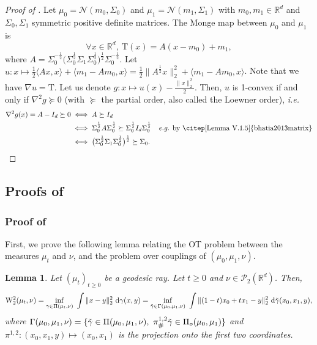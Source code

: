 \documentclass[twoside]{article}
\newtheorem{lemma}{Lemma}
\newcommand{\W}{\mathrm{W}}
\newcommand{\T}{\mathrm{T}}
\begin{document}
\begin{proof}[Proof of ]
    Let $\mu_0=\mathcal{N}(m_0,\Sigma_0)$ and $\mu_1=\mathcal{N}(m_1,\Sigma_1)$ with $m_0,m_1\in\mathbb{R}^d$ and $\Sigma_0,\Sigma_1$ symmetric positive definite matrices. The Monge map between $\mu_0$ and $\mu_1$ is \citep[Remark 2.31]{peyre2019computational} 
    \begin{equation}
        \forall x\in \mathbb{R}^d,\ \T(x) = A(x-m_0) + m_1,
    \end{equation}
    where $A=\Sigma_0^{-\frac12}\big(\Sigma_0^{\frac12}\Sigma_1\Sigma_0^{\frac12}\big)^\frac12 \Sigma_0^{-\frac12}$. Let $u:x\mapsto \frac12 \langle Ax,x\rangle + \langle m_1-Am_0,x\rangle = \frac12 \|A^{\frac12}x\|_2^2 + \langle m_1-Am_0,x\rangle$. Note that we have $\nabla u = \T$. Let us denote $g:x\mapsto u(x) - \frac{\|x\|_2^2}{2}$. Then, $u$ is 1-convex if and only if $\nabla^2 g \succeq 0$ (with $\succeq$ the partial order, also called the Loewner order), \emph{i.e.}
    \begin{equation} \label{eq:geodesic_rays_gaussians}
        \begin{aligned}
            \nabla^2 g(x) = A-I_d \succeq 0 &\iff A \succeq I_d \\
            &\iff \Sigma_0^{\frac12} A \Sigma_0^{\frac12} \succeq \Sigma_0^{\frac12} I_d \Sigma_0^{\frac12} \quad \text{\emph{e.g.} by \citep[Lemma V.1.5]{bhatia2013matrix}} \\
            &\iff \big(\Sigma_0^{\frac12}\Sigma_1\Sigma_0^{\frac12}\big)^{\frac12} \succeq \Sigma_0.
        \end{aligned}
    \end{equation}
\end{proof}


\subsection{Proofs of } \label{proofs:busemann}

\subsubsection{Proof of } \label{proof:prop_busemann_general}

First, we prove the following lemma relating the OT problem between the measures $\mu_t$ and $\nu$, and the problem over couplings of $(\mu_0,\mu_1,\nu)$.
\begin{lemma} \label{lemma:ot_geod}
    Let $(\mu_t)_{t\ge 0}$ be a geodesic ray. Let $t\ge 0$ and $\nu\in\mathcal{P}_2(\mathbb{R}^d)$. Then, 
    \begin{equation}
        \W_2^2(\mu_t,\nu) = \inf_{\gamma\in\Pi(\mu_t,\nu)}\ \int \|x-y\|_2^2\ \mathrm{d}\gamma(x,y) = \inf_{\Tilde{\gamma}\in \Gamma(\mu_0,\mu_1,\nu)}\ \int \|(1-t)x_0+tx_1 -y\|_2^2\ \mathrm{d}\Tilde{\gamma}(x_0,x_1,y),
    \end{equation}
    where $\Gamma(\mu_0,\mu_1,\nu) = \{\Tilde{\gamma}\in\Pi(\mu_0,\mu_1,\nu),\ \pi^{1,2}_\#\Tilde{\gamma}\in\Pi_o(\mu_0,\mu_1)\}$ and $\pi^{1,2}:(x_0,x_1,y)\mapsto (x_0,x_1)$ is the projection onto the first two coordinates.
\end{lemma}
\end{document}
